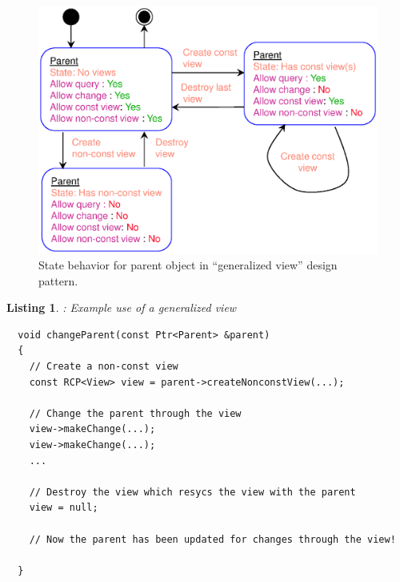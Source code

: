 \documentclass[pdf,ps2pdf,11pt]{SANDreport}
\newtheorem{listing}{Listing}
\begin{document}
{\bsinglespace
\begin{figure}[p]
\begin{center}
\includegraphics*[angle=0,scale=0.65]{GeneralizedViewStateDiagram}
\end{center}
\caption{
\label{fig:GeneralizedViewStateDiagram}
State behavior for parent object in ``generalized view'' design
pattern.}
\end{figure}
\esinglespace}


{}\begin{listing}: Example use of a generalized view
\label{listing:generalized-view-ex1}
{\small\begin{verbatim}
  void changeParent(const Ptr<Parent> &parent)
  {
    // Create a non-const view
    const RCP<View> view = parent->createNonconstView(...);

    // Change the parent through the view
    view->makeChange(...);
    view->makeChange(...);
    ...

    // Destroy the view which resycs the view with the parent
    view = null;

    // Now the parent has been updated for changes through the view!

  }
\end{verbatim}}
\end{listing}
\end{document}
